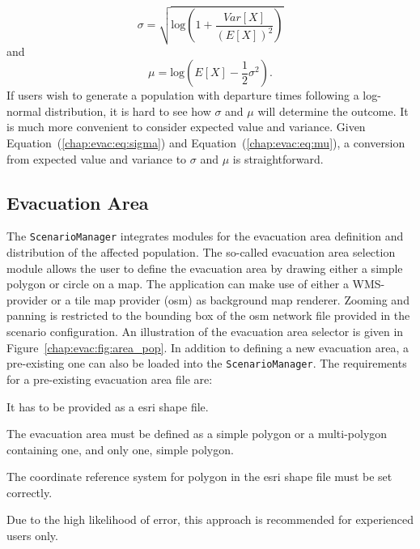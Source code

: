 \begin{equation}
\sigma = \sqrt{\text{log}(1+\frac{Var[X]}{(E[X])^2})}\label{chap:evac:eq:sigma}
\end{equation}
and 
\begin{equation}
\mu = \text{log}(E[X] - \frac{1}{2}\sigma^2).\label{chap:evac:eq:mu}
\end{equation}
If users wish to generate a population with departure times following a log-normal distribution, it is hard to see how $\sigma$ and $\mu$ will determine the outcome. It is much more convenient to consider expected value and variance. Given Equation~(\ref{chap:evac:eq:sigma}) and Equation~(\ref{chap:evac:eq:mu}), a conversion from expected value and variance to $\sigma$ and $\mu$ is straightforward.

\subsection{Evacuation Area}%
The \lstinline|ScenarioManager| integrates modules for the evacuation area definition and distribution of the affected population. The so-called evacuation area selection module allows the user to define the evacuation area by drawing either a simple polygon or circle on a map. The application can make use of either a WMS-provider or a tile map provider (\eg \gls{osm}) as background map renderer. Zooming and panning is restricted to the bounding box of the \gls{osm} network file provided in the scenario configuration. An illustration of the evacuation area selector is given in Figure~\ref{chap:evac:fig:area_pop}. In addition to defining a new evacuation area, a pre-existing one can also be loaded into the \lstinline|ScenarioManager|. The requirements for a pre-existing evacuation area file are:
\begin{compactitem}
\item It has to be provided as a \gls{esri} shape file.
\item The evacuation area must be defined as a simple polygon or a multi-polygon containing one, and only one, simple polygon.
\item The coordinate reference system for polygon in the \gls{esri} shape file must be set correctly. 
\end{compactitem}
Due to the high likelihood of error, this approach is recommended for experienced users only.

